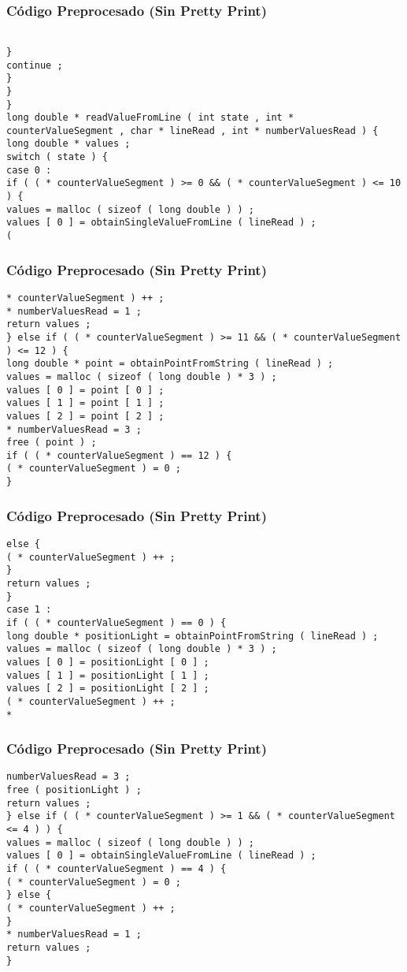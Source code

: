 \documentclass{beamer}
\begin{document}
\begin{frame}[fragile]
\frametitle{C\'odigo Preprocesado (Sin Pretty Print)}
\begin{lstlisting}[style=CStyle]

} 
continue ; 
} 
} 
} 
long double * readValueFromLine ( int state , int * counterValueSegment , char * lineRead , int * numberValuesRead ) { 
long double * values ; 
switch ( state ) { 
case 0 : 
if ( ( * counterValueSegment ) >= 0 && ( * counterValueSegment ) <= 10 ) { 
values = malloc ( sizeof ( long double ) ) ; 
values [ 0 ] = obtainSingleValueFromLine ( lineRead ) ; 
( \end{lstlisting}
\end{frame}
\begin{frame}[fragile]
\frametitle{C\'odigo Preprocesado (Sin Pretty Print)}
\begin{lstlisting}[style=CStyle]
* counterValueSegment ) ++ ; 
* numberValuesRead = 1 ; 
return values ; 
} else if ( ( * counterValueSegment ) >= 11 && ( * counterValueSegment ) <= 12 ) { 
long double * point = obtainPointFromString ( lineRead ) ; 
values = malloc ( sizeof ( long double ) * 3 ) ; 
values [ 0 ] = point [ 0 ] ; 
values [ 1 ] = point [ 1 ] ; 
values [ 2 ] = point [ 2 ] ; 
* numberValuesRead = 3 ; 
free ( point ) ; 
if ( ( * counterValueSegment ) == 12 ) { 
( * counterValueSegment ) = 0 ; 
} \end{lstlisting}
\end{frame}
\begin{frame}[fragile]
\frametitle{C\'odigo Preprocesado (Sin Pretty Print)}
\begin{lstlisting}[style=CStyle]
else { 
( * counterValueSegment ) ++ ; 
} 
return values ; 
} 
case 1 : 
if ( ( * counterValueSegment ) == 0 ) { 
long double * positionLight = obtainPointFromString ( lineRead ) ; 
values = malloc ( sizeof ( long double ) * 3 ) ; 
values [ 0 ] = positionLight [ 0 ] ; 
values [ 1 ] = positionLight [ 1 ] ; 
values [ 2 ] = positionLight [ 2 ] ; 
( * counterValueSegment ) ++ ; 
* \end{lstlisting}
\end{frame}
\begin{frame}[fragile]
\frametitle{C\'odigo Preprocesado (Sin Pretty Print)}
\begin{lstlisting}[style=CStyle]
numberValuesRead = 3 ; 
free ( positionLight ) ; 
return values ; 
} else if ( ( * counterValueSegment ) >= 1 && ( * counterValueSegment <= 4 ) ) { 
values = malloc ( sizeof ( long double ) ) ; 
values [ 0 ] = obtainSingleValueFromLine ( lineRead ) ; 
if ( ( * counterValueSegment ) == 4 ) { 
( * counterValueSegment ) = 0 ; 
} else { 
( * counterValueSegment ) ++ ; 
} 
* numberValuesRead = 1 ; 
return values ; 
} \end{lstlisting}
\end{frame}
\end{document}

